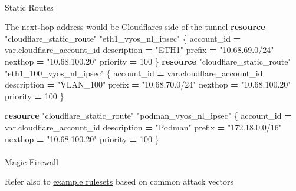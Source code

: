 \documentclass[
]{article}
\makeatletter
\let\oldparagraph\paragraph
\renewcommand{\paragraph}{
    \@ifstar
      \xxxParagraphStar
      \xxxParagraphNoStar
  }
\newcommand{\xxxParagraphStar}[1]{\oldparagraph*{#1}\mbox{}}
\newcommand{\xxxParagraphNoStar}[1]{\oldparagraph{#1}\mbox{}}
\newenvironment{Shaded}{\begin{snugshade}}{\end{snugshade}}
\newcommand{\DecValTok}[1]{\textcolor[rgb]{0.00,0.00,0.81}{#1}}
\newcommand{\KeywordTok}[1]{\textcolor[rgb]{0.13,0.29,0.53}{\textbf{#1}}}
\newcommand{\NormalTok}[1]{#1}
\newcommand{\OperatorTok}[1]{\textcolor[rgb]{0.81,0.36,0.00}{\textbf{#1}}}
\newcommand{\StringTok}[1]{\textcolor[rgb]{0.31,0.60,0.02}{#1}}
\newcommand{\VariableTok}[1]{\textcolor[rgb]{0.00,0.00,0.00}{#1}}
\makeatother
\begin{document}
\newpage{}

\paragraph{Static Routes}\label{static-routes}

\begin{Shaded}
\begin{Highlighting}[numbers=left,,]
\NormalTok{The \textasciigrave{}next}\OperatorTok{{-}}\NormalTok{hop\textasciigrave{} address would be Cloudflare\textquotesingle{}s side of the tunnel}
\KeywordTok{resource} \StringTok{"cloudflare\_static\_route"} \StringTok{"eth1\_vyos\_nl\_ipsec"}\NormalTok{ \{}
\NormalTok{  account\_id  }\OperatorTok{=} \VariableTok{var}\NormalTok{.cloudflare\_account\_id}
\NormalTok{  description }\OperatorTok{=} \StringTok{"ETH1"}
\NormalTok{  prefix      }\OperatorTok{=} \StringTok{"10.68.69.0/24"}
\NormalTok{  nexthop     }\OperatorTok{=} \StringTok{"10.68.100.20"}
\NormalTok{  priority    }\OperatorTok{=} \DecValTok{100}
\NormalTok{\}}
\KeywordTok{resource} \StringTok{"cloudflare\_static\_route"} \StringTok{"eth1\_100\_vyos\_nl\_ipsec"}\NormalTok{ \{}
\NormalTok{  account\_id  }\OperatorTok{=} \VariableTok{var}\NormalTok{.cloudflare\_account\_id}
\NormalTok{  description }\OperatorTok{=} \StringTok{"VLAN\_100"}
\NormalTok{  prefix      }\OperatorTok{=} \StringTok{"10.68.70.0/24"}
\NormalTok{  nexthop     }\OperatorTok{=} \StringTok{"10.68.100.20"}
\NormalTok{  priority    }\OperatorTok{=} \DecValTok{100}
\NormalTok{\}}
 
\KeywordTok{resource} \StringTok{"cloudflare\_static\_route"} \StringTok{"podman\_vyos\_nl\_ipsec"}\NormalTok{ \{}
\NormalTok{  account\_id  }\OperatorTok{=} \VariableTok{var}\NormalTok{.cloudflare\_account\_id}
\NormalTok{  description }\OperatorTok{=} \StringTok{"Podman"}
\NormalTok{  prefix      }\OperatorTok{=} \StringTok{"172.18.0.0/16"}
\NormalTok{  nexthop     }\OperatorTok{=} \StringTok{"10.68.100.20"}
\NormalTok{  priority    }\OperatorTok{=} \DecValTok{100}
\NormalTok{\}}
\end{Highlighting}
\end{Shaded}

\newpage{}

\paragraph{Magic Firewall}\label{magic-firewall}

Refer also to
\href{https://developers.cloudflare.com/magic-firewall/best-practices/}{example
rulesets} based on common attack vectors
\end{document}
